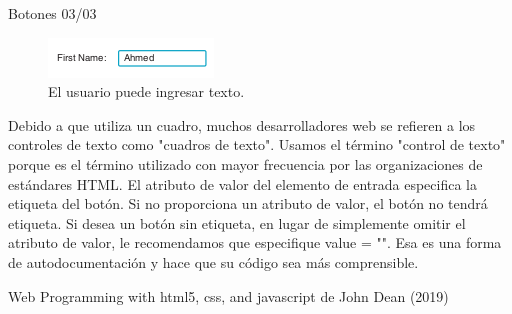 \begin{frame}{Botones 03/03}
\justifying
\begin{figure}[H]
\centering
\includegraphics[scale=0.5]{Section_Files/images/Sec01/04.png}
\caption{El usuario puede ingresar texto.}
\end{figure}
Debido a que utiliza un cuadro, muchos desarrolladores web se refieren a los controles de texto como "cuadros de texto". Usamos el término "control de texto" porque es el término utilizado con mayor frecuencia por las organizaciones de estándares HTML.
El atributo de valor del elemento de entrada especifica la etiqueta del botón. Si no proporciona un atributo de valor, el botón no tendrá etiqueta. Si desea un botón sin etiqueta, en lugar de simplemente omitir el atributo de valor, le recomendamos que especifique value = "". Esa es una forma de autodocumentación y hace que su código sea más comprensible.


{\tiny Web Programming with html5, css, and javascript de John Dean (2019)}
\end{frame}

